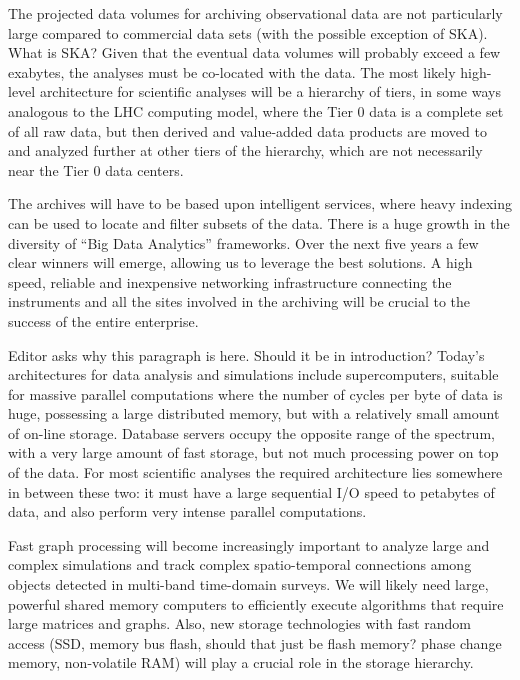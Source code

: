 The projected
data volumes for archiving observational data 
are not particularly large compared to
commercial data sets (with the possible exception of SKA). 
{\red What is SKA?}
Given that
the eventual data volumes will probably exceed a few exabytes, the
analyses must be co-located with the data.
The most likely high-level architecture for scientific analyses will
be a hierarchy of tiers, in some ways analogous to the LHC computing
model, where the Tier 0 data is a complete set of all raw data,
but then derived and value-added data products are moved to and analyzed
further at other tiers of the hierarchy, which are not necessarily
near
the Tier 0 data centers.

The archives will have to be based upon intelligent services, where
heavy indexing can be used to locate and filter subsets of the
data. 
There is a huge growth in the diversity of ``Big Data
Analytics'' frameworks.
Over the next five years a
few clear winners will emerge, allowing us to
leverage the best solutions. A high speed, reliable and
inexpensive networking infrastructure connecting the instruments and
all the sites involved in the archiving will be crucial to the success
of the entire enterprise.

{\red Editor asks why this paragraph is here.  Should it be in introduction?}
Today's architectures for data analysis and simulations include
supercomputers, suitable for massive parallel computations where the
number of cycles per byte of data is huge, possessing a large
distributed memory, but with a relatively small amount of on-line
storage. Database servers occupy the opposite range of the spectrum,
with a very large amount of fast storage, but not much processing
power on top of the data. For most scientific analyses the required
architecture lies somewhere in between these two: it must have a large
sequential I/O speed to petabytes of data, and also perform very
intense parallel computations. 

Fast graph processing will become increasingly important to analyze large
and complex simulations
and track complex
spatio-temporal connections among objects detected in multi-band
time-domain surveys. 
We will likely need large, powerful shared memory computers to efficiently
execute algorithms that require large matrices and graphs.
Also, new storage technologies with
fast random access (SSD, memory bus flash, {\red should that just be
flash memory?}  phase change memory, 
non-volatile RAM) will play a crucial role in the storage hierarchy.

